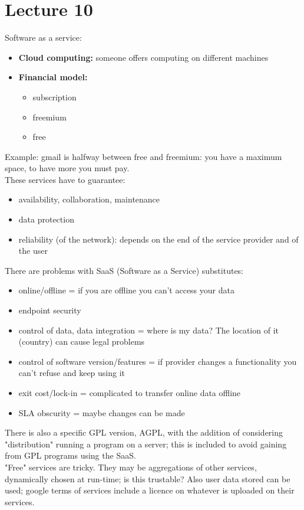 \documentclass[a4paper, 10pt, titlepage]{article}
\begin{document}
\section{Lecture 10}
Software as a service:
\begin{itemize}
\item \textbf{Cloud computing:} someone offers computing on different machines
\item \textbf{Financial model:} 
	\begin{itemize}
	\item subscription
	\item freemium
	\item free
	\end{itemize}
\end{itemize}
Example: gmail is halfway between free and freemium: you have a maximum space, to have more you must pay. \medskip \\
These services have to guarantee:
\begin{itemize}
\item availability, collaboration, maintenance
\item data protection
\item reliability (of the network): depends on the end of the service provider and of the user
\end{itemize}
There are problems with SaaS (Software as a Service) substitutes:
\begin{itemize}
\item online/offline = if you are offline you can't access your data
\item endpoint security
\item control of data, data integration = where is my data? The location of it (country) can cause legal problems
\item control of software version/features = if provider changes a functionality you can't refuse and keep using it
\item exit cost/lock-in = complicated to transfer online data offline
\item SLA obscurity = maybe changes can be made
\end{itemize}
There is also a specific GPL version, AGPL, with the addition of considering "distribution" running a program on a server; this is included to avoid gaining from GPL programs using the SaaS. \medskip \\
"Free" services are tricky. They may be aggregations of other services, dynamically chosen at run-time; is this trustable? Also user data stored can be used; google terms of services include a licence on whatever is uploaded on their services.
\end{document}
